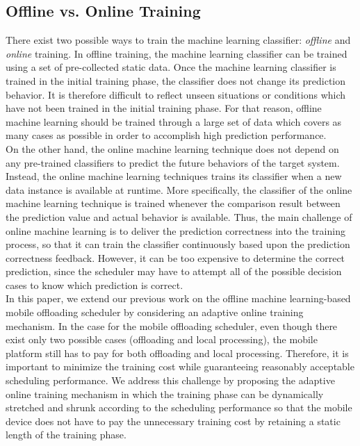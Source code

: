 \documentclass[10pt, conference, compsocconf]{IEEEtran}
\begin{document}
\subsection{Offline vs. Online Training}
%
%
There exist two possible ways to train the machine learning
classifier: \textit{offline} and \textit{online} training.
%
In offline training, the machine learning classifier can be trained
using a set of pre-collected static data.
%
Once the machine learning classifier is trained in the initial training
phase, the classifier does not change its prediction behavior.
%
It is therefore difficult to reflect unseen situations or conditions
which have not been trained in the initial training phase.
%
For that reason, offline machine learning should be trained through a
large set of data which covers as many cases as possible in order to
accomplish high prediction performance.\\
%
\indent On the other hand, the online machine learning technique does
not depend on any pre-trained classifiers to predict the future
behaviors of the target system.
%
Instead, the online machine learning techniques trains its classifier
when a new data instance is available at runtime.
%
More specifically, the classifier of the online machine learning
technique is trained whenever the comparison result between the
prediction value and actual behavior is available.
%
Thus, the main challenge of online machine learning is to deliver the
prediction correctness into the training process, so that it can train
the classifier continuously based upon the prediction correctness feedback.
%
%
%
However, it can be too expensive to determine the correct prediction,
since the scheduler may have to attempt all of the possible decision
cases to know which prediction is correct.\\
%
\indent In this paper, we extend our previous work on the offline
machine learning-based mobile offloading scheduler by considering an
adaptive online training mechanism.
%
In the case for the mobile offloading scheduler, even though
there exist only two possible cases (offloading and local processing),
the mobile platform still has to pay for both offloading and local
processing.  
%
Therefore, it is important to minimize the training cost while
guaranteeing reasonably acceptable scheduling performance.
%
We address this challenge by proposing the adaptive online training
mechanism in which the training phase can be dynamically stretched and
shrunk according to the scheduling performance so that the mobile device
does not have to pay the unnecessary training cost by retaining a static
length of the training phase. 
%
\end{document}
